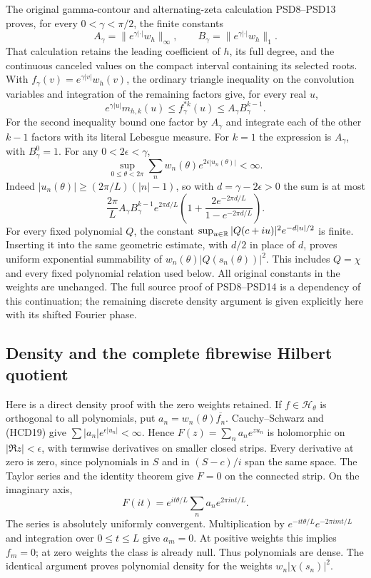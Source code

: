 The original gamma-contour and alternating-zeta calculation
PSD8--PSD13 proves, for every $0<\gamma<\pi/2$, the finite
constants
\[
 A_\gamma=\|e^{\gamma|\cdot|}w_h\|_\infty,\qquad
 B_\gamma=\|e^{\gamma|\cdot|}w_h\|_1.
\]
That calculation retains the leading coefficient of $h$,
its full degree, and the continuous canceled values on the
compact interval containing its selected roots. With
$f_\gamma(v)=e^{\gamma|v|}w_h(v)$, the ordinary triangle
inequality on the convolution variables and integration
of the remaining factors give, for every real $u$,
\[
 e^{\gamma|u|}m_{h,k}(u)
 \le f_\gamma^{*k}(u)
 \le A_\gamma B_\gamma^{k-1}.
 \tag{HCD19a}
\]
For the second inequality bound one factor by $A_\gamma$
and integrate each of the other $k-1$ factors with its
literal Lebesgue measure. For $k=1$ the expression is
$A_\gamma$, with $B_\gamma^0=1$.
For any $0<2\epsilon<\gamma$,
\[
 \sup_{0\le\theta<2\pi}
 \sum_nw_n(\theta)e^{2\epsilon|u_n(\theta)|}<\infty.
 \tag{HCD19}
\]
Indeed $|u_n(\theta)|\ge(2\pi/L)(|n|-1)$, so with
$d=\gamma-2\epsilon>0$ the sum is at most
\[
 \frac{2\pi}{L}A_\gamma B_\gamma^{k-1}
 e^{2\pi d/L}
 \left(1+\frac{2e^{-2\pi d/L}}{1-e^{-2\pi d/L}}\right).
\]
For every fixed polynomial $Q$, the constant
$\sup_{u\in\mathbb{R}}|Q(c+iu)|^2e^{-d|u|/2}$ is finite.
Inserting it into the same geometric estimate, with
$d/2$ in place of $d$, proves uniform exponential
summability of $w_n(\theta)|Q(s_n(\theta))|^2$.
This includes $Q=\chi$ and every fixed polynomial
relation used below. All original constants in the
weights are unchanged. The full source proof of
PSD8--PSD14 is a dependency of this continuation;
the remaining discrete density argument is given
explicitly here with its shifted Fourier phase.

\subsection{Density and the complete fibrewise Hilbert quotient}

Here is a direct density proof with the zero weights retained.
If $f\in\mathcal H_\theta$ is orthogonal to all polynomials,
put $a_n=w_n(\theta)\overline{f_n}$. Cauchy--Schwarz and
(HCD19) give $\sum|a_n|e^{\epsilon|u_n|}<\infty$.
Hence $F(z)=\sum_n a_ne^{zu_n}$ is holomorphic on
$|\Re z|<\epsilon$, with termwise derivatives on smaller
closed strips. Every derivative at zero is zero, since
polynomials in $S$ and in $(S-c)/i$ span the same space.
The Taylor series and the identity theorem give $F=0$
on the connected strip. On the imaginary axis,
\[
 F(it)=e^{it\theta/L}\sum_n a_ne^{2\pi int/L}.
\]
The series is absolutely uniformly convergent.
Multiplication by $e^{-it\theta/L}e^{-2\pi imt/L}$ and
integration over $0\le t\le L$ give $a_m=0$.
At positive weights this implies $f_m=0$; at zero weights
the class is already null. Thus polynomials are dense.
The identical argument proves polynomial density for
the weights $w_n|\chi(s_n)|^2$.

